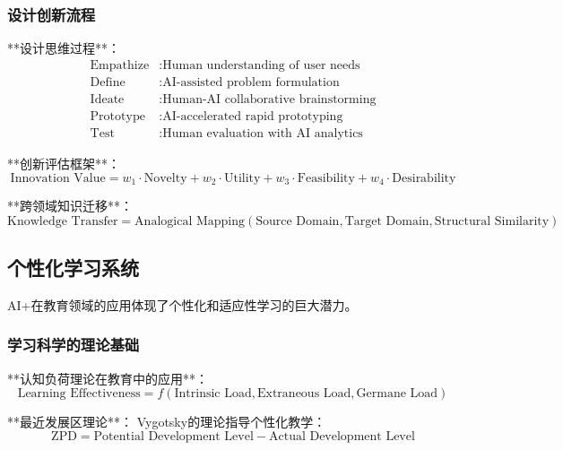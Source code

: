 \subsubsection{设计创新流程} %

**设计思维过程**：
\begin{align}
\text{Empathize} &: \text{Human understanding of user needs} \\
\text{Define} &: \text{AI-assisted problem formulation} \\
\text{Ideate} &: \text{Human-AI collaborative brainstorming} \\
\text{Prototype} &: \text{AI-accelerated rapid prototyping} \\
\text{Test} &: \text{Human evaluation with AI analytics}
\end{align}

**创新评估框架**：
\begin{equation}
\text{Innovation Value} = w_1 \cdot \text{Novelty} + w_2 \cdot \text{Utility} + w_3 \cdot \text{Feasibility} + w_4 \cdot \text{Desirability}
\end{equation}

**跨领域知识迁移**：
\begin{equation}
\text{Knowledge Transfer} = \text{Analogical Mapping}(\text{Source Domain}, \text{Target Domain}, \text{Structural Similarity})
\end{equation}

\subsection{个性化学习系统}

AI+在教育领域的应用体现了个性化和适应性学习的巨大潜力。

\subsubsection{学习科学的理论基础} %

**认知负荷理论在教育中的应用**：
\begin{equation}
\text{Learning Effectiveness} = f(\text{Intrinsic Load}, \text{Extraneous Load}, \text{Germane Load})
\end{equation}

**最近发展区理论**：
Vygotsky的理论指导个性化教学：
\begin{equation}
\text{ZPD} = \text{Potential Development Level} - \text{Actual Development Level}
\end{equation}

